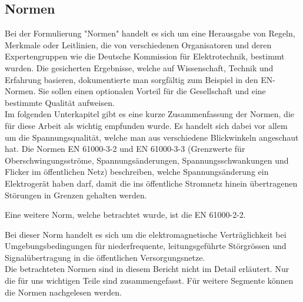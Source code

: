 \subsection{Normen}\label{sec:Normen}
Bei der Formulierung "Normen" handelt es sich um eine Herausgabe von Regeln, Merkmale oder Leitlinien, die von verschiedenen Organisatoren und deren Expertengruppen wie die Deutsche Kommission für Elektrotechnik, bestimmt wurden. Die gesicherten Ergebnisse, welche auf Wissenschaft, Technik und Erfahrung basieren, dokumentierte man sorgfältig zum Beispiel in den EN-Normen. Sie sollen einen optionalen Vorteil für die Gesellschaft und eine bestimmte Qualität aufweisen.\\
Im folgenden Unterkapitel gibt es eine kurze Zusammenfassung der Normen, die für diese Arbeit als wichtig empfunden wurde. Es handelt sich dabei vor allem um die Spannungsqualität, welche man aus verschiedene Blickwinkeln angeschaut hat. Die Normen EN 61000-3-2 und EN 61000-3-3 (Grenzwerte für Oberschwingungsströme, Spannungsänderungen, Spannungsschwankungen und Flicker im öffentlichen Netz) beschreiben, welche Spannungsänderung ein Elektrogerät haben darf, damit die ins öffentliche Stromnetz hinein übertragenen Störungen in Grenzen gehalten werden.

Eine weitere Norm, welche betrachtet wurde, ist die EN 61000-2-2.


Bei dieser Norm handelt es sich um die elektromagnetische Verträglichkeit bei Umgebungsbedingungen für niederfrequente, leitungsgeführte Störgrössen und Signalübertragung in die öffentlichen Versorgungsnetze.\\
Die betrachteten Normen sind in diesem Bericht nicht im Detail erläutert. Nur die für uns wichtigen Teile sind zusammengefasst. Für weitere Segmente können die Normen nachgelesen werden. 


